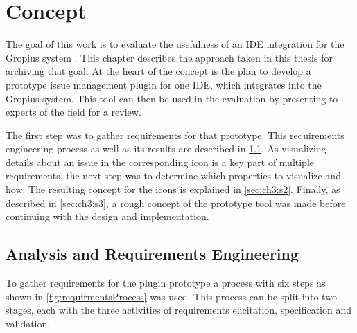 
\chapter{Concept}
\label{chap:ch3}
The goal of this work is to evaluate the usefulness of an \gls{IDE} integration for the Gropius system \cite{speth2020gropius}.
This chapter describes the approach taken in this thesis for archiving that goal.
At the heart of the concept is the plan to develop a prototype issue management plugin for one \gls{IDE},
which integrates into the Gropius system.
This tool can then be used in the evaluation by presenting to experts of the field for a review.

The first step was to gather requirements for that prototype. 
This requirements engineering process as well as its results are described in \cref{sec:ch3:s1}.
As visualizing details about an issue in the corresponding icon is a key part of multiple requirements,
the next step was to determine which properties to visualize and how.
The resulting concept for the icons is explained in \cref{sec:ch3:s2}.
Finally, as described in \cref{sec:ch3:s3}, 
a rough concept of the prototype tool was made before continuing with the design and implementation.

\section{Analysis and Requirements Engineering}
\label{sec:ch3:s1}
To gather requirements for the plugin prototype a process with six steps as shown in \cref{fig:requirmentsProcess} was used.
This process can be split into two stages, each with the three activities of requirements elicitation, specification and validation.

